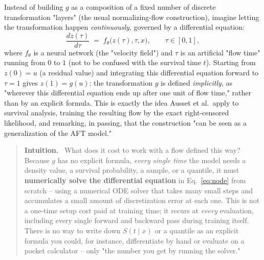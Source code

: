 \documentclass[11pt]{article}
\newenvironment{intuition}
  {\par\addvspace{8pt}\begin{quote}\noindent\textbf{\textcolor{blue!40!black}{Intuition.}}\ }
  {\end{quote}\par\addvspace{8pt}}
\begin{document}
Instead of building $g$ as a composition of a fixed number of discrete
transformation "layers" (the usual normalizing-flow construction),
imagine letting the transformation happen \emph{continuously}, governed
by a differential equation:
\begin{equation}
  \frac{dz(\tau)}{d\tau} \;=\; f_\theta\bigl(z(\tau), \tau, x\bigr), \qquad \tau \in [0, 1],
  \label{eq:node}
\end{equation}
where $f_\theta$ is a neural network (the "velocity field") and $\tau$ is
an artificial "flow time" running from $0$ to $1$ (not to be confused
with the survival time $t$). Starting from $z(0) = u$ (a residual value)
and integrating this differential equation forward to $\tau = 1$ gives
$z(1) = g(u)$: the transformation $g$ is defined \emph{implicitly}, as
"wherever this differential equation ends up after one unit of flow
time," rather than by an explicit formula. This is exactly the idea
Ausset et al.\ apply to survival analysis, training the resulting flow by
the exact right-censored likelihood, and remarking, in passing, that the
construction "can be seen as a generalization of the AFT model."

\begin{intuition}
What does it cost to work with a flow defined this way? Because $g$ has
no explicit formula, \emph{every single time} the model needs a density
value, a survival probability, a sample, or a quantile, it must
\textbf{numerically solve the differential equation} in
Eq.~\eqref{eq:node} from scratch -- using a numerical ODE solver that
takes many small steps and accumulates a small amount of discretization
error at each one. This is not a one-time setup cost paid at training
time; it recurs at \emph{every} evaluation, including every single
forward and backward pass during training itself. There is no way to
write down $S(t\mid x)$ or a quantile as an explicit formula you could,
for instance, differentiate by hand or evaluate on a pocket calculator --
only "the number you get by running the solver."
\end{intuition}
\end{document}
